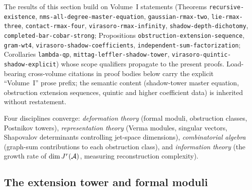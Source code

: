 \begin{remark}
The results of this section build on Volume~I
statements (Theorems \texttt{recursive-existence},
\texttt{nms-all-degree-master-equation},
\texttt{gaussian-rmax-two}, \texttt{lie-rmax-three},
\texttt{contact-rmax-four}, \texttt{virasoro-rmax-infinity},
\texttt{shadow-depth-dichotomy},
\texttt{completed-bar-cobar-strong};
Propositions \texttt{obstruction-extension-sequence},
\texttt{gram-wt4}, \texttt{virasoro-shadow-coefficients},
\texttt{independent-sum-factorization};
Corollaries \texttt{lambda-qp},
\texttt{mittag-leffler-shadow-tower},
\texttt{virasoro-quintic-shadow-explicit}) whose scope qualifiers
propagate to the present proofs. Load-bearing cross-volume citations
in proof bodies below carry the explicit ``Volume~I'' prose prefix;
the semantic content (shadow-tower master equation, obstruction
extension sequences, quintic and higher coefficient data) is inherited
without restatement.
\end{remark}

Four disciplines converge:
\emph{deformation theory} (formal moduli, obstruction classes, Postnikov towers),
\emph{representation theory} (Verma modules, singular vectors, Shapovalov determinants controlling jet-space dimensions),
\emph{combinatorial algebra} (graph-sum contributions to each obstruction class), and
\emph{information theory} (the growth rate of $\dim J^r(\mathcal{A})$, measuring reconstruction complexity).


\subsection{The extension tower and formal moduli}

